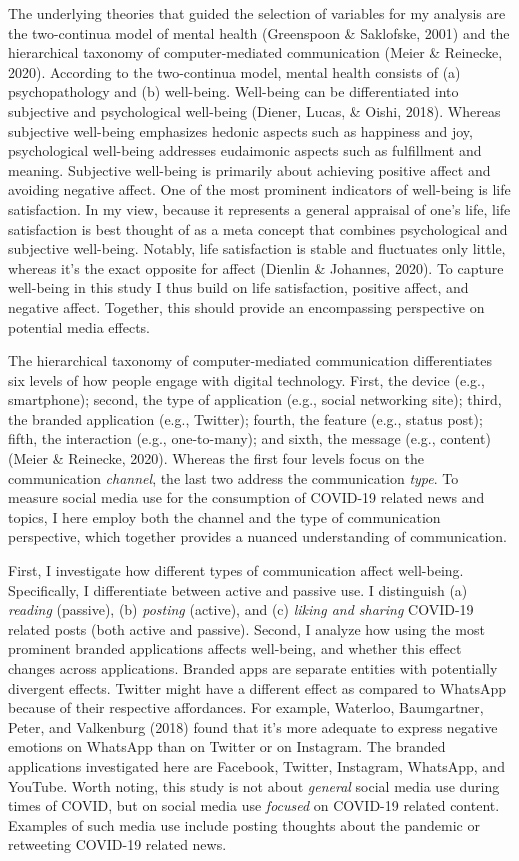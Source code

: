 \documentclass[
  english,
  man,mask,floatsintext]{apa6}
\begin{document}
The underlying theories that guided the selection of variables for my analysis are the two-continua model of mental health (Greenspoon \& Saklofske, 2001) and the hierarchical taxonomy of computer-mediated communication (Meier \& Reinecke, 2020).
According to the two-continua model, mental health consists of (a) psychopathology and (b) well-being.
Well-being can be differentiated into subjective and psychological well-being (Diener, Lucas, \& Oishi, 2018).
Whereas subjective well-being emphasizes hedonic aspects such as happiness and joy, psychological well-being addresses eudaimonic aspects such as fulfillment and meaning.
Subjective well-being is primarily about achieving positive affect and avoiding negative affect.
One of the most prominent indicators of well-being is life satisfaction.
In my view, because it represents a general appraisal of one's life, life satisfaction is best thought of as a meta concept that combines psychological and subjective well-being.
Notably, life satisfaction is stable and fluctuates only little, whereas it's the exact opposite for affect (Dienlin \& Johannes, 2020).
To capture well-being in this study I thus build on life satisfaction, positive affect, and negative affect.
Together, this should provide an encompassing perspective on potential media effects.

The hierarchical taxonomy of computer-mediated communication differentiates six levels of how people engage with digital technology.
First, the device (e.g., smartphone); second, the type of application (e.g., social networking site); third, the branded application (e.g., Twitter); fourth, the feature (e.g., status post); fifth, the interaction (e.g., one-to-many); and sixth, the message (e.g., content) (Meier \& Reinecke, 2020).
Whereas the first four levels focus on the communication \emph{channel}, the last two address the communication \emph{type}.
To measure social media use for the consumption of COVID-19 related news and topics, I here employ both the channel and the type of communication perspective, which together provides a nuanced understanding of communication.

First, I investigate how different types of communication affect well-being.
Specifically, I differentiate between active and passive use.
I distinguish (a) \emph{reading} (passive), (b) \emph{posting} (active), and (c) \emph{liking and sharing} COVID-19 related posts (both active and passive).
Second, I analyze how using the most prominent branded applications affects well-being, and whether this effect changes across applications.
Branded apps are separate entities with potentially divergent effects.
Twitter might have a different effect as compared to WhatsApp because of their respective affordances.
For example, Waterloo, Baumgartner, Peter, and Valkenburg (2018) found that it's more adequate to express negative emotions on WhatsApp than on Twitter or on Instagram.
The branded applications investigated here are Facebook, Twitter, Instagram, WhatsApp, and YouTube.
Worth noting, this study is not about \emph{general} social media use during times of COVID, but on social media use \emph{focused} on COVID-19 related content.
Examples of such media use include posting thoughts about the pandemic or retweeting COVID-19 related news.
\end{document}
